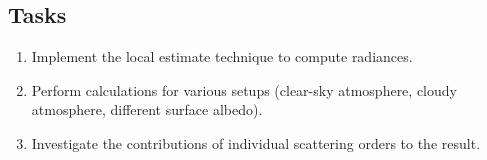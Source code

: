 \documentclass[12pt,twoside,a4paper]{article}
\begin{document}
\subsection{Tasks}

\begin{enumerate}
\item Implement the local estimate technique to compute radiances.
\item Perform calculations for various setups (clear-sky atmosphere,
  cloudy atmosphere, different surface albedo).
\item Investigate the contributions of individual scattering orders to
  the result. 
\end{enumerate}




\clearpage


%
\end{document}
